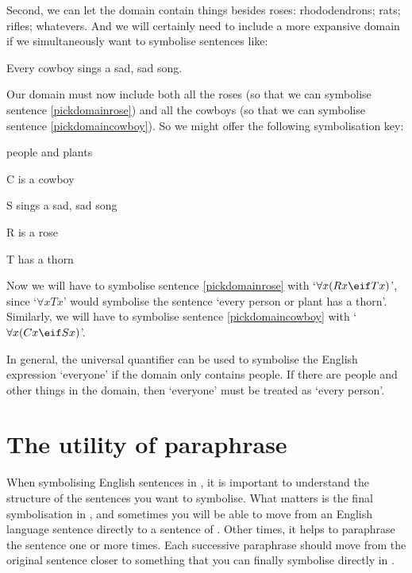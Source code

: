 Second, we can let the domain contain things besides roses: rhododendrons; rats; rifles; whatevers.  And we will certainly need to include a more expansive domain if we simultaneously want to symbolise sentences like:
	\begin{earg}
		\item[\ex{pickdomaincowboy}] Every cowboy sings a sad, sad song.
	\end{earg}
Our domain must now include both all the roses (so that we can symbolise sentence \ref{pickdomainrose}) and all the cowboys (so that we can symbolise sentence \ref{pickdomaincowboy}). So we might offer the following symbolisation key:\label{poison}
	\begin{ekey}
		\item[\text{domain}] people and plants
		\item[C]  is a cowboy
		\item[S]  sings a sad, sad song
		\item[R]  is a rose
		\item[T]  has a thorn
	\end{ekey}
Now we will have to symbolise sentence \ref{pickdomainrose} with `$\forall x (Rx \eif Tx)$', since `$\forall x Tx$' would symbolise the sentence `every person or plant has a thorn'. Similarly, we will have to symbolise sentence \ref{pickdomaincowboy} with `$\forall x (Cx \eif Sx)$'. 

In general, the universal quantifier can be used to symbolise the English expression `everyone' if the domain only contains people. If there are people and other things in the domain, then `everyone' must be treated as `every person'.


\section{The utility of paraphrase}
When symbolising English sentences in \FOL, it is important to understand the structure of the sentences you want to symbolise. What matters is the final symbolisation in \FOL, and sometimes you will be able to move from an English language sentence directly to a sentence of \FOL. Other times, it helps to paraphrase the sentence one or more times. Each successive paraphrase should move from the original sentence closer to something that you can finally symbolise directly in \FOL.

